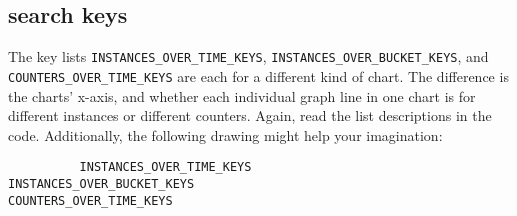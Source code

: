 \documentclass[a4paper,11pt]{article}
\begin{document}
\subsection*{search keys}
The key lists \verb|INSTANCES_OVER_TIME_KEYS|, \verb|INSTANCES_OVER_BUCKET_KEYS|, and \verb|COUNTERS_|\break\verb|OVER_TIME_KEYS| are each for a different kind of chart. The difference is the charts' x-axis, and whether each individual graph line in one chart is for different instances or different counters. Again, read the list descriptions in the code. Additionally, the following drawing might help your imagination:

\begin{lstlisting}
          INSTANCES_OVER_TIME_KEYS                         INSTANCES_OVER_BUCKET_KEYS                        COUNTERS_OVER_TIME_KEYS


\end{lstlisting}
\end{document}
